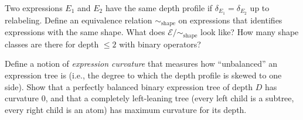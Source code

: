 \begin{exercise}
  Two expressions $E_1$ and $E_2$ have the same depth profile if
  $\delta_{E_1} = \delta_{E_2}$ up to relabeling. Define an
  equivalence relation $\sim_\text{shape}$ on expressions that
  identifies expressions with the same shape. What does $\mathcal{E}/{\sim_\text{shape}}$
  look like? How many shape classes are there for depth $\leq 2$
  with binary operators?
\end{exercise}

\begin{exercise}[title={Harder}]
  Define a notion of \emph{expression curvature} that measures how
  ``unbalanced'' an expression tree is (i.e., the degree to which
  the depth profile is skewed to one side). Show that a perfectly
  balanced binary expression tree of depth $D$ has curvature 0,
  and that a completely left-leaning tree (every left child is a
  subtree, every right child is an atom) has maximum curvature for
  its depth.
\end{exercise}
